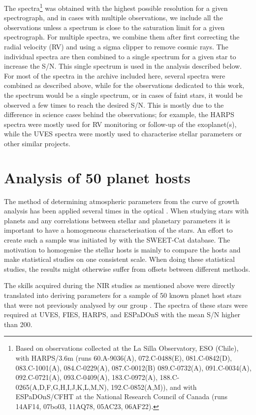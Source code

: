 The spectra\footnote{Based on observations collected at the La Silla Observatory, ESO (Chile), with
HARPS/3.6m (runs 60.A-9036(A), 072.C-0488(E), 081.C-0842(D), 083.C-1001(A), 084.C-0229(A),
087.C-0012(B) 089.C-0732(A), 091.C-0034(A), 092.C-0721(A), 093.C-0409(A), 183.C-0972(A),
188.C-0265(A,D,F,G,H,I,J,K,L,M,N), 192.C-0852(A,M)), and with ESPaDOnS/CFHT at the National Research
Council of Canada (runs 14AF14, 07bo03, 11AQ78, 05AC23, 06AF22).} was obtained with the highest
possible resolution for a given spectrograph, and in cases with multiple observations, we include
all the observations unless a spectrum is close to the saturation limit for a given spectrograph.
For multiple spectra, we combine them after first correcting the radial velocity (RV) and using a
sigma clipper to remove cosmic rays. The individual spectra are then combined to a single spectrum
for a given star to increase the S/N. This single spectrum is used in the analysis described below.
For most of the spectra in the archive included here, several spectra were combined as described
above, while for the observations dedicated to this work, the spectrum would be a single spectrum,
or in cases of faint stars, it would be observed a few times to reach the desired S/N. This is
mostly due to the difference in science cases behind the observations; for example, the HARPS
spectra were mostly used for RV monitoring or follow-up of the exoplanet(s), while the UVES spectra
were mostly used to characterise stellar parameters or other similar projects.

\section{Analysis of 50 planet hosts}
\label{sec:sweetcat_analysis}

The method of determining atmospheric parameters from the curve of growth analysis has been applied
several times in the optical \citep[see e.g.][]{Mortier2013b,Tsantaki2013,Sousa2011,Santos2013}.
When studying stars with planets and any correlations between stellar and planetary parameters it is
important to have a homogeneous characterisation of the stars. An effort to create such a sample was
initiated by \citet{Santos2013} with the SWEET-Cat database. The motivation to homogenise the
stellar hosts is mainly to compare the hosts and make statistical studies on one consistent scale.
When doing these statistical studies, the results might otherwise suffer from offsets between
different methods.

The skills acquired during the NIR studies as mentioned above were directly translated into deriving
parameters for a sample of 50 known planet host stars that were not previously analysed by our group
\citep{Andreasen2017a}. The spectra of these stars were required at UVES, FIES, HARPS, and ESPaDOnS
with the mean S/N higher than 200.

